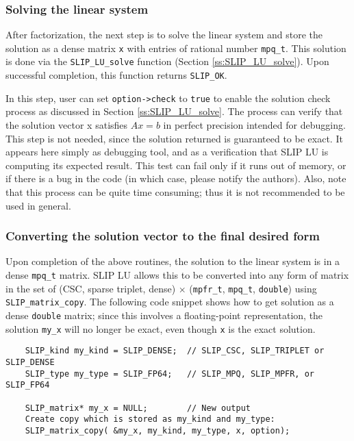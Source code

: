 \documentclass[12pt]{article}
\theoremstyle{definition}
\begin{document}
\subsubsection{Solving the linear system}

After factorization, the next step is to solve the linear system and store the
solution as a dense matrix \verb|x| with entries of rational number
\verb|mpq_t|. This solution is done via the \verb|SLIP_LU_solve|
function (Section \ref{ss:SLIP_LU_solve}). 
Upon successful completion, this function returns \verb|SLIP_OK|.

In this step, user can set \verb|option->check| to \verb|true| to enable the
solution check process as discussed in Section \ref{ss:SLIP_LU_solve}.  The
process can verify that the solution vector x satisfies $Ax=b$ in perfect
precision intended for debugging.  This step is not needed, since the solution
returned is guaranteed to be exact.   It appears here simply as debugging tool,
and as a verification that SLIP LU is computing its expected result.  This test
can fail only if it runs out of memory, or if there is a bug in the code (in
which case, please notify the authors).  Also, note that this process can be
quite time consuming; thus it is not recommended to be used in general.

\subsubsection{Converting the solution vector to the final desired form}

Upon completion of the above routines, the solution to the linear system is in
a dense \verb|mpq_t| matrix. SLIP LU allows this to be converted into any form
of matrix in the set of (CSC, sparse triplet, dense) $\times$ (\verb|mpfr_t|,
\verb|mpq_t|, \verb|double|) using \verb|SLIP_matrix_copy|. The following code
snippet shows how to get solution as a dense \verb|double| matrix; since this
involves a floating-point representation, the solution \verb|my_x| will no
longer be exact, even though \verb|x| is the exact solution.

{\small
\begin{verbatim}
    SLIP_kind my_kind = SLIP_DENSE;  // SLIP_CSC, SLIP_TRIPLET or SLIP_DENSE
    SLIP_type my_type = SLIP_FP64;   // SLIP_MPQ, SLIP_MPFR, or SLIP_FP64

    SLIP_matrix* my_x = NULL;        // New output
    Create copy which is stored as my_kind and my_type:
    SLIP_matrix_copy( &my_x, my_kind, my_type, x, option);\end{verbatim} }
\end{document}
